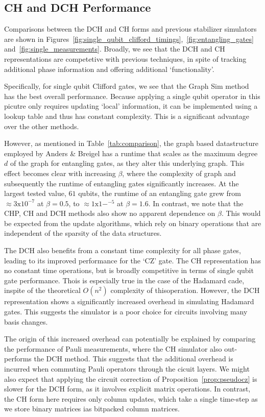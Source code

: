 \subsection*{CH and DCH Performance}
Comparisons between the DCH and CH forms and previous stabilizer simulators are shown in Figures~\ref{fig:single_qubit_clifford_timings},~\ref{fig:entangling_gates} and~\ref{fig:single_measurements}. Broadly, we see that the DCH and CH representations are competetive with previous techniques, in spite of tracking additional phase information and offering additional `functionality'.\par
Specifically, for single qubit Clifford gates, we see that the Graph Sim method has the best overall performance. Because applying a single qubit operator in this picutre only requires updating `local' information, it can be implemented using a lookup table and thus has constant complexity. This is a significant advantage over the other methods.\par
However, as mentioned in Table~\ref{tab:comparison}, the graph based datastructure employed by Anders \& Breigel has a runtime that scales as the maximum degree $d$ of the graph for entangling gates, as they alter this underlying graph. This effect becomes clear with increasing $\beta$, where the complexity of graph and subsequently the runtime of entangling gates significantly increases. At the largest tested value, $61$ qubits, the runtime of an entangling gate grew from $\approx 3\mathrm{x}10^{-7}$ at $\beta=0.5$, to $\approx 1\mathrm{x}1-^{-5}$ at $\beta=1.6$. In contrast, we note that the CHP, CH and DCH methods also show no apparent dependence on $\beta$. This would be expected from the update algorithms, which rely on binary operations that are independent of the sparsity of the data structures.\par
The DCH also benefits from a constant time complexity for all phase gates, leading to its improved performance for the `CZ' gate. The CH representation has no constant time operations, but is broadly competitive in terms of single qubit gate performance. Thois is especially true in the case of the Hadamard cade, inspite of the theoretical $O(n^{2})$ complexity of thisoperation. However, the DCH representation shows a significantly increased overhead in simulating Hadamard gates. This suggests the simulator is a poor choice for circuits involving many basis changes.\par
The origin of this increased overhead can potentially be explained by comparing the performance of Pauli measurements, where the CH simulator also out-performs the DCH method. This suggests that the additional overhead is incurred when commuting Pauli operators through the cicuit layers. We might also expect that applying the circuit correction of Proposition~\ref{prop:pseudocz} is slower for the DCH form, as it involves explicit matrix operations. In contrast, the CH form here requires only column updates, which take a single time-step as we store binary matrices ias bitpacked column matrices.\par
